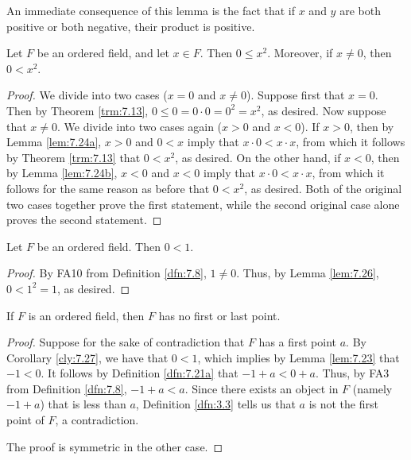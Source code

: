 \documentclass[../main.tex]{subfiles}
\begin{document}
\begin{remark}\label{rmk:7.25}
    An immediate consequence of this lemma is the fact that if $x$ and $y$ are both positive or both negative, their product is positive.
\end{remark}

\begin{lemma}\label{lem:7.26}
    Let $F$ be an ordered field, and let $x\in F$. Then $0\leq x^2$. Moreover, if $x\neq 0$, then $0<x^2$.
    \begin{proof}
        We divide into two cases ($x=0$ and $x\neq 0$). Suppose first that $x=0$. Then by Theorem \ref{trm:7.13}, $0\leq 0=0\cdot 0=0^2=x^2$, as desired. Now suppose that $x\neq 0$. We divide into two cases again ($x>0$ and $x<0$). If $x>0$, then by Lemma \ref{lem:7.24a}, $x>0$ and $0<x$ imply that $x\cdot 0<x\cdot x$, from which it follows by Theorem \ref{trm:7.13} that $0<x^2$, as desired. On the other hand, if $x<0$, then by Lemma \ref{lem:7.24b}, $x<0$ and $x<0$ imply that $x\cdot 0<x\cdot x$, from which it follows for the same reason as before that $0<x^2$, as desired. Both of the original two cases together prove the first statement, while the second original case alone proves the second statement.
    \end{proof}
\end{lemma}

\begin{corollary}\label{cly:7.27}
    Let $F$ be an ordered field. Then $0<1$.
    \begin{proof}
        By FA10 from Definition \ref{dfn:7.8}, $1\neq 0$. Thus, by Lemma \ref{lem:7.26}, $0<1^2=1$, as desired.
    \end{proof}
\end{corollary}

\begin{theorem}\label{trm:7.28}
    If $F$ is an ordered field, then $F$ has no first or last point.
    \begin{proof}
        Suppose for the sake of contradiction that $F$ has a first point $a$. By Corollary \ref{cly:7.27}, we have that $0<1$, which implies by Lemma \ref{lem:7.23} that $-1<0$. It follows by Definition \ref{dfn:7.21a} that $-1+a<0+a$. Thus, by FA3 from Definition \ref{dfn:7.8}, $-1+a<a$. Since there exists an object in $F$ (namely $-1+a$) that is less than $a$, Definition \ref{dfn:3.3} tells us that $a$ is not the first point of $F$, a contradiction.\par
        The proof is symmetric in the other case.
    \end{proof}
\end{theorem}
\end{document}
